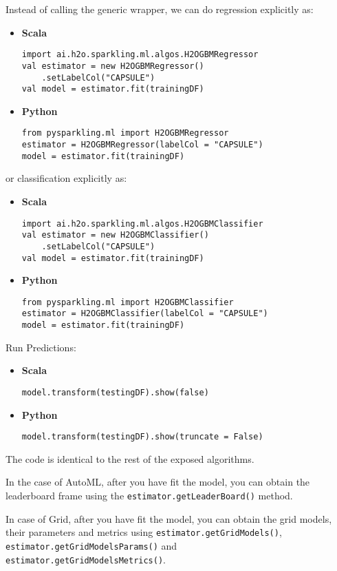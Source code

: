 \documentclass{standalone}
\begin{document}
	Instead of calling the generic wrapper, we can do regression explicitly as:

	\begin{itemize}
		\item \textbf{Scala} \begin{lstlisting}[style=Scala]
import ai.h2o.sparkling.ml.algos.H2OGBMRegressor
val estimator = new H2OGBMRegressor()
	.setLabelCol("CAPSULE")
val model = estimator.fit(trainingDF)
		\end{lstlisting}
		\item \textbf{Python} \begin{lstlisting}[style=Python]
from pysparkling.ml import H2OGBMRegressor
estimator = H2OGBMRegressor(labelCol = "CAPSULE")
model = estimator.fit(trainingDF)
		\end{lstlisting}
	\end{itemize}

	or classification explicitly as:

	\begin{itemize}
		\item \textbf{Scala} \begin{lstlisting}[style=Scala]
import ai.h2o.sparkling.ml.algos.H2OGBMClassifier
val estimator = new H2OGBMClassifier()
	.setLabelCol("CAPSULE")
val model = estimator.fit(trainingDF)
		\end{lstlisting}
		\item \textbf{Python} \begin{lstlisting}[style=Python]
from pysparkling.ml import H2OGBMClassifier
estimator = H2OGBMClassifier(labelCol = "CAPSULE")
model = estimator.fit(trainingDF)
		\end{lstlisting}
	\end{itemize}

	Run Predictions:

	\begin{itemize}
		\item \textbf{Scala} \begin{lstlisting}[style=Scala]
model.transform(testingDF).show(false)
		\end{lstlisting}
		\item \textbf{Python} \begin{lstlisting}[style=Python]
model.transform(testingDF).show(truncate = False)
		\end{lstlisting}
	\end{itemize}

	The code is identical to the rest of the exposed algorithms.

	In the case of AutoML, after you have fit the model, you can obtain the leaderboard frame using the
	\texttt{estimator.getLeaderBoard()} method.

	In case of Grid, after you have fit the model, you can obtain the grid models, their parameters and metrics using
	\texttt{estimator.getGridModels()}, \texttt{estimator.getGridModelsParams()} and \\
	\texttt{estimator.getGridModelsMetrics()}.
\end{document}
